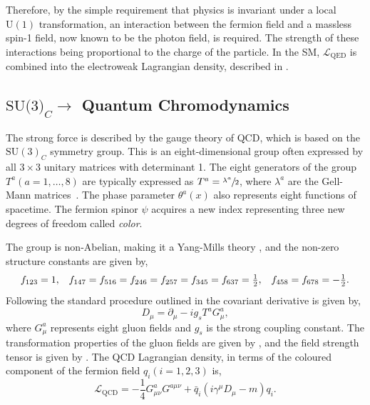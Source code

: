 Therefore, by the simple requirement that physics is invariant under a local $\text{U}(1)$ transformation, an interaction between the fermion field and a massless spin-1 field, now known to be the photon field, is required.
The strength of these interactions being proportional to the charge of the particle.
In the SM, $\mathcal{L}_\text{QED}$ is combined into the electroweak Lagrangian density, described in .

\subsection{\texorpdfstring{$\text{SU(3)}_C\rightarrow$}{SU(3)-} Quantum Chromodynamics}
\label{sec:qcd}

The strong force is described by the gauge theory of QCD, which is based on the $\text{SU}(3)_C$ symmetry group.
This is an eight-dimensional group often expressed by all $3 \times 3$ unitary matrices with determinant 1.
The eight generators of the group $T^a{ }(a = 1, \ldots, 8)$ are typically expressed as $T^a = \sfrac{\lambda^a}{2}$, where $\lambda^a$ are the Gell-Mann matrices~\cite{gellmannmatrices}.
The phase parameter $\theta^a(x)$ also represents eight functions of spacetime.
The fermion spinor $\psi$ acquires a new index representing three new degrees of freedom called \textit{color}.

The group is non-Abelian, making it a Yang-Mills theory \cite{yangmills}, and the non-zero structure constants are given by,
\begin{equation}
	\label{eq:qcd_sc}
	\begin{array}{ccc}
		f_{123} = 1 ,                                                            & \hspace{\stretch{1}}
		f_{147} = f_{516} = f_{246} = f_{257} = f_{345} = f_{637} = \frac{1}{2}, & \hspace{\stretch{1}}
		f_{458} = f_{678} = -\frac{1}{2}.
	\end{array}
\end{equation}
Following the standard procedure outlined in  the covariant derivative is given by,
\begin{equation}
	\label{eq:qcd_covariant_derivative}
	D_\mu = \partial_\mu - i g_s T^a G_\mu^a,
\end{equation}
where $G_\mu^a$ represents eight gluon fields and $g_s$ is the strong coupling constant.
The transformation properties of the gluon fields are given by , and the field strength tensor is given by .
The QCD Lagrangian density, in terms of the coloured component of the fermion field $q_i(i = 1, 2, 3)$ is,
\begin{equation}
	\label{eq:qcd_lagrangian}
	\mathcal{L}_\text{QCD} = -\frac{1}{4} G_{\mu\nu}^a G^{a\mu\nu} + \bar q_i (i \gamma^\mu D_\mu - m) q_i.
\end{equation}

